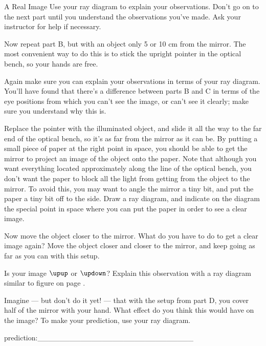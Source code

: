 \begin{lab}{A Real Image}
Use your ray diagram to explain your observations.
Don't go on to the next part until you understand the observations you've made. Ask your
instructor for help if necessary.


Now repeat part B, but with an object only 5 or 10 cm from the mirror. The most convenient
way to do this is to stick the upright pointer in the optical bench, so your hands are free.

\labspaceforraydiagram

Again make sure you can explain your observations in terms of your ray diagram.
You'll have found that there's a difference between parts B and C in terms of the eye positions
from which you can't see the image, or can't see it clearly; make sure you understand why this is.

Replace the pointer with the illuminated object, and slide it all the way to the far end
of the optical bench, so it's as far from the mirror as it can be. By putting a small piece of paper at the right
point in space, you should be able to get the mirror to project an image of the object onto
the paper. Note that although you want everything located approximately along the line
of the optical bench, you don't want the paper to block all the light from getting from
the object to the mirror. To avoid this, you may want to angle the mirror a tiny bit, and
put the paper a tiny bit off to the side. Draw a ray diagram, and indicate on the diagram
the special point in space where you can put the paper in order to see a clear image.

\labspaceforraydiagram

Now move the object closer to the mirror. What do you have to do to get a clear image again?
Move the object closer and closer to the mirror, and keep going as far as you can with this
setup.

Is your image $\upup$ or $\updown$? Explain this observation with a ray diagram similar to
figure  on
page \pageref{fig:flatmirrorchangedistance}.

\labspaceforraydiagram

Imagine --- but don't do it yet! --- that with the setup from part D, you cover half of the
mirror with your hand. What effect do you think this would have on the image? To make
your prediction, use your ray diagram.

\newcommand{\labprediction}{prediction:\_\_\_\_\_\_\_\_\_\_\_\_\_\_\_\_\_\_\_\_\_\_\_\_\_\_\_\_\_}
\labprediction


\end{lab}
